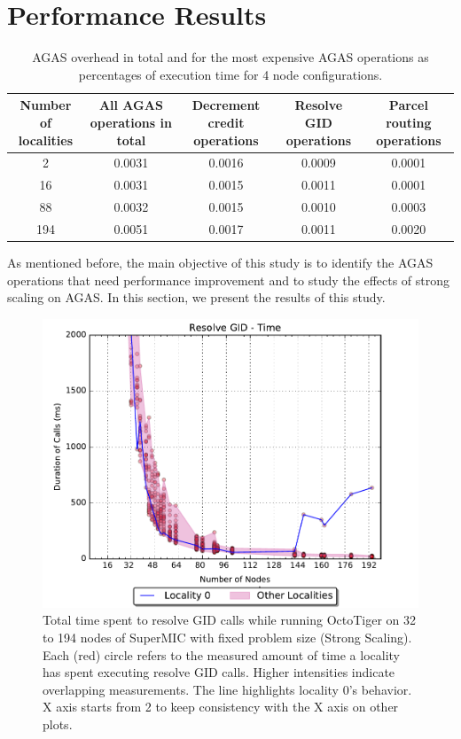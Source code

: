 \section{Performance Results}
\label{results}

\begin{table}[t]
    \caption{AGAS overhead in total and for the most expensive AGAS operations as percentages of execution time for 4 node configurations.}
    \centering
    \label{tab:exec-percent}
    \begin{tabular}{ccccc}
        \toprule
        Number of localities & All AGAS operations in total & Decrement credit operations & Resolve GID operations & Parcel routing operations \\
        \hline
        2   & 0.0031 & 0.0016 & 0.0009 & 0.0001 \\
        16  & 0.0031 & 0.0015 & 0.0011 & 0.0001 \\
        88  & 0.0032 & 0.0015 & 0.0010 & 0.0003 \\
        194 & 0.0051 & 0.0017 & 0.0011 & 0.0020 \\
        \bottomrule
    \end{tabular}
\end{table}

As mentioned before, the main objective of this study is to identify the AGAS
operations that need performance improvement and to study the effects of strong
scaling on AGAS. In this section, we present the results of this study.

\begin{figure}[t]
    \centering
    \includegraphics[width=.54\textwidth,height=\textheight,keepaspectratio]{graphs/octotiger_resolve_gid_time}
    \caption{Total time spent to resolve GID calls while running OctoTiger on 32 to 194 nodes of SuperMIC with fixed problem size (Strong Scaling). Each (red) circle refers to the measured amount of time a locality has spent executing resolve GID calls. Higher intensities indicate overlapping measurements. The line highlights locality 0's behavior. X axis starts from 2 to keep consistency with the X axis on other plots.}
    \label{fig:octgr_strong_resolve_gid_time}
\end{figure}

